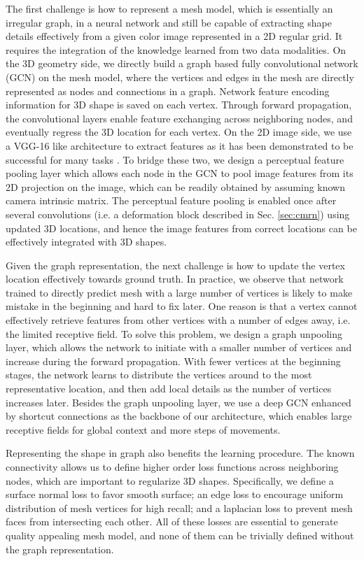 \documentclass[runningheads]{llncs}
\newcommand{\secref}[1]{Sec. \ref{#1}}
\begin{document}
The first challenge is how to represent a mesh model, which is essentially an irregular graph, in a neural network and still be capable of extracting shape details effectively from a given color image represented in a 2D regular grid.
It requires the integration of the knowledge learned from two data modalities.
On the 3D geometry side, we directly build a graph based fully convolutional network (GCN) \cite{BronsteinBLSV17,DefferrardBV16,KipfW16} on the mesh model, where the vertices and edges in the mesh are directly represented as nodes and connections in a graph.
Network feature encoding information for 3D shape is saved on each vertex.
Through forward propagation, the convolutional layers enable feature exchanging across neighboring nodes, and eventually regress the 3D location for each vertex.
On the 2D image side, we use a VGG-16 like architecture to extract features as it has been demonstrated to be successful for many tasks \cite{GatysEB16,LiCK18}.
To bridge these two, we design a perceptual feature pooling layer which allows each node in the GCN to pool image features from its 2D projection on the image, which can be readily obtained by assuming known camera intrinsic matrix.
The perceptual feature pooling is enabled once after several convolutions (i.e. a deformation block described in \secref{sec:cmrn}) using updated 3D locations, and hence the image features from correct locations can be effectively integrated with 3D shapes.

Given the graph representation, the next challenge is how to update the vertex location effectively towards ground truth. 
In practice, we observe that network trained to directly predict mesh with a large number of vertices is likely to make mistake in the beginning and hard to fix later.
One reason is that a vertex cannot effectively retrieve features from other vertices with a number of edges away, i.e. the limited receptive field.
To solve this problem, we design a graph unpooling layer, which allows the network to initiate with a smaller number of vertices and increase during the forward propagation.
With fewer vertices at the beginning stages, the network learns to distribute the vertices around to the most representative location, and then add local details as the number of vertices increases later.
Besides the graph unpooling layer, we use a deep GCN enhanced by shortcut connections \cite{HeZRS16} as the backbone of our architecture, which enables large receptive fields for global context and more steps of movements.


Representing the shape in graph also benefits the learning procedure.
The known connectivity allows us to define higher order loss functions across neighboring nodes, which are important to regularize 3D shapes.
Specifically, we define a surface normal loss to favor smooth surface; an edge loss to encourage uniform distribution of mesh vertices for high recall; and a laplacian loss to prevent mesh faces from intersecting each other.
All of these losses are essential to generate quality appealing mesh model, and none of them can be trivially defined without the graph representation.
\end{document}
